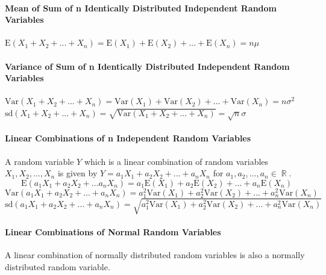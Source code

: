 \documentclass[a4paper,twoside,10pt]{article}
\DeclareMathOperator\R{\mathbb{R}}
\begin{document}
			\paragraph{Mean of Sum of n Identically Distributed Independent Random Variables} $\displaystyle\mathrm{E}(X_1+X_2+...+X_n)=\mathrm{E}(X_1)+\mathrm{E}(X_2)+...+\mathrm{E}(X_n)=n\mu$
			
			\paragraph{Variance of Sum of n Identically Distributed Independent Random Variables} $\displaystyle\mathrm{Var}(X_1+X_2+...+X_n)=\mathrm{Var}(X_1)+\mathrm{Var}(X_2)+...+\mathrm{Var}(X_n)=n\sigma^2$\\
			$\displaystyle\mathrm{sd}(X_1+X_2+...+X_n)=\sqrt{\mathrm{Var}(X_1+X_2+...+X_n)}=\sqrt{n}\sigma$
			
			\paragraph{Linear Combinations of n Independent Random Variables} A random variable $Y$ which is a linear combination of random variables $X_1,X_2,...,X_n$ is given by $Y=a_1X_1+a_2X_2+...+a_nX_n$ for $a_1,a_2,...,a_n\in\R$.
			\[
				\mathrm{E}(a_1X_1+a_2X_2+...a_nX_n)=a_1\mathrm{E}(X_1)+a_2\mathrm{E}(X_2)+...+a_n\mathrm{E}(X_n)
			\]
			\[
				\mathrm{Var}(a_1X_1+a_2X_2+...+a_nX_n)=a_1^2\mathrm{Var}(X_1)+a_2^2\mathrm{Var}(X_2)+...+a_n^2\mathrm{Var}(X_n)
			\]
			\[
				\mathrm{sd}(a_1X_1+a_2X_2+...+a_nX_n)=\sqrt{a_1^2\mathrm{Var}(X_1)+a_2^2\mathrm{Var}(X_2)+...+a_n^2\mathrm{Var}(X_n)}
			\]
		
			\paragraph{Linear Combinations of Normal Random Variables} A linear combination of normally distributed random variables is also a normally distributed random variable.
\end{document}
